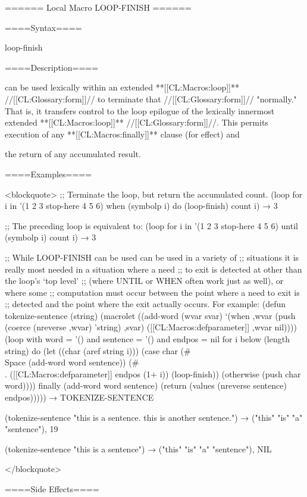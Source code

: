 ====== Local Macro LOOP-FINISH ======

====Syntax====

\DefmacNoReturn loop-finish {\noargs}

====Description====

 can be used lexically within an extended **[[CL:Macros:loop]]** //[[CL:Glossary:form]]// to terminate that //[[CL:Glossary:form]]// "normally." That is, it transfers control to the loop epilogue of the lexically innermost extended **[[CL:Macros:loop]]** //[[CL:Glossary:form]]//. This permits execution of any **[[CL:Macros:finally]]** clause (for effect) and

the return of any accumulated result.

====Examples====

<blockquote> ;; Terminate the loop, but return the accumulated count. (loop for i in '(1 2 3 stop-here 4 5 6) when (symbolp i) do (loop-finish) count i) → 3

;; The preceding loop is equivalent to: (loop for i in '(1 2 3 stop-here 4 5 6) until (symbolp i) count i) → 3

;; While LOOP-FINISH can be used can be used in a variety of ;; situations it is really most needed in a situation where a need ;; to exit is detected at other than the loop's `top level' ;; (where UNTIL or WHEN often work just as well), or where some ;; computation must occur between the point where a need to exit is ;; detected and the point where the exit actually occurs. For example: (defun tokenize-sentence (string) (macrolet ((add-word (wvar svar) `(when ,wvar (push (coerce (nreverse ,wvar) 'string) ,svar) ([[CL:Macros:defparameter]] ,wvar nil)))) (loop with word = '() and sentence = '() and endpos = nil for i below (length string) do (let ((char (aref string i))) (case char (#\\Space (add-word word sentence)) (#\\. ([[CL:Macros:defparameter]] endpos (1+ i)) (loop-finish)) (otherwise (push char word)))) finally (add-word word sentence) (return (values (nreverse sentence) endpos))))) → TOKENIZE-SENTENCE

(tokenize-sentence "this is a sentence. this is another sentence.") → ("this" "is" "a" "sentence"), 19

(tokenize-sentence "this is a sentence") → ("this" "is" "a" "sentence"), NIL

</blockquote>

====Side Effects====


